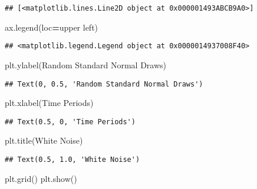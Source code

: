 \documentclass[
]{book}
\newenvironment{Shaded}{\begin{snugshade}}{\end{snugshade}}
\newcommand{\NormalTok}[1]{#1}
\newcommand{\OperatorTok}[1]{\textcolor[rgb]{0.81,0.36,0.00}{\textbf{#1}}}
\newcommand{\StringTok}[1]{\textcolor[rgb]{0.31,0.60,0.02}{#1}}
\begin{document}
\begin{verbatim}
## [<matplotlib.lines.Line2D object at 0x000001493ABCB9A0>]
\end{verbatim}

\begin{Shaded}
\begin{Highlighting}[]
\NormalTok{ax.legend(loc}\OperatorTok{=}\StringTok{\textquotesingle{}upper left\textquotesingle{}}\NormalTok{)}
\end{Highlighting}
\end{Shaded}

\begin{verbatim}
## <matplotlib.legend.Legend object at 0x0000014937008F40>
\end{verbatim}

\begin{Shaded}
\begin{Highlighting}[]
\NormalTok{plt.ylabel(}\StringTok{\textquotesingle{}Random Standard Normal Draws\textquotesingle{}}\NormalTok{)}
\end{Highlighting}
\end{Shaded}

\begin{verbatim}
## Text(0, 0.5, 'Random Standard Normal Draws')
\end{verbatim}

\begin{Shaded}
\begin{Highlighting}[]
\NormalTok{plt.xlabel(}\StringTok{\textquotesingle{}Time Periods\textquotesingle{}}\NormalTok{)}
\end{Highlighting}
\end{Shaded}

\begin{verbatim}
## Text(0.5, 0, 'Time Periods')
\end{verbatim}

\begin{Shaded}
\begin{Highlighting}[]
\NormalTok{plt.title(}\StringTok{\textquotesingle{}White Noise\textquotesingle{}}\NormalTok{)}
\end{Highlighting}
\end{Shaded}

\begin{verbatim}
## Text(0.5, 1.0, 'White Noise')
\end{verbatim}

\begin{Shaded}
\begin{Highlighting}[]
\NormalTok{plt.grid()}
\NormalTok{plt.show()}
\end{Highlighting}
\end{Shaded}
\end{document}
